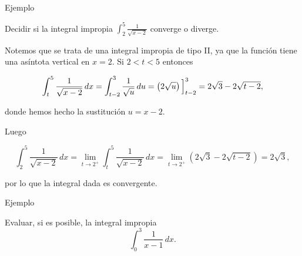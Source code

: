 \documentclass[
  letterpaper,
]{book}
\theoremstyle{plain}
\theoremstyle{remark}
\begin{document}
Ejemplo

Decidir si la integral impropia
\(\displaystyle \int_2^5 \frac{1}{\sqrt{x-2}}\) converge o diverge.

\begin{tcolorbox}[enhanced jigsaw, opacityback=0, left=2mm, opacitybacktitle=0.6, toprule=.15mm, bottomrule=.15mm, colbacktitle=quarto-callout-tip-color!10!white, titlerule=0mm, bottomtitle=1mm, title=\textcolor{quarto-callout-tip-color}{\faLightbulb}\hspace{0.5em}{Solución}, toptitle=1mm, colframe=quarto-callout-tip-color-frame, colback=white, breakable, rightrule=.15mm, arc=.35mm, leftrule=.75mm, coltitle=black]

Notemos que se trata de una integral impropia de tipo II, ya que la
función tiene una asíntota vertical en \(x=2\). Si \(2<t<5\) entonces

\[
\int_t^5 \frac{1}{\sqrt{x-2}}\,dx=\int_{t-2}^3 \frac{1}{\sqrt{u}}\,du=\left(2\sqrt{u}\right)\Big{]}_{t-2}^3=2\sqrt{3}-2\sqrt{t-2},
\]

donde hemos hecho la sustitución \(u=x-2\).

Luego

\[
\int_2^5 \frac{1}{\sqrt{x-2}}\,dx=\lim_{t\to 2^+} \int_t^5 \frac{1}{\sqrt{x-2}}\,dx=\lim_{t\to 2^+} \left(2\sqrt{3}-2\sqrt{t-2}\right)=2\sqrt{3},
\]

por lo que la integral dada es convergente.

\end{tcolorbox}

Ejemplo

Evaluar, si es posible, la integral impropia \[
\int_{0}^{3}\frac{1}{x-1}\,dx.
\]
\end{document}
